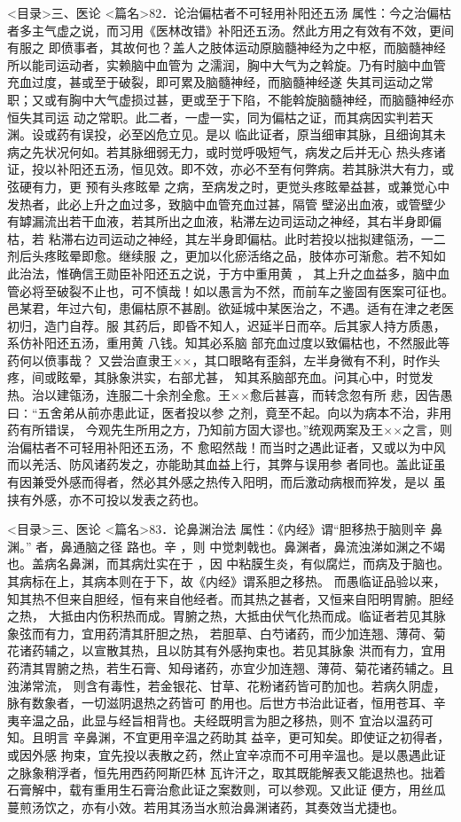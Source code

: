 \documentclass[a4paper,12pt,UTF8,twoside]{ctexbook}
\begin{document}
<目录>三、医论
<篇名>82．论治偏枯者不可轻用补阳还五汤
属性：今之治偏枯者多主气虚之说，而习用《医林改错》补阳还五汤。然此方用之有效有不效，更间有服之 
即偾事者，其故何也？盖人之肢体运动原脑髓神经为之中枢，而脑髓神经所以能司运动者，实赖脑中血管为 
之濡润，胸中大气为之斡旋。乃有时脑中血管充血过度，甚或至于破裂，即可累及脑髓神经，而脑髓神经遂 
失其司运动之常职；又或有胸中大气虚损过甚，更或至于下陷，不能斡旋脑髓神经，而脑髓神经亦恒失其司运 
动之常职。此二者，一虚一实，同为偏枯之证，而其病因实判若天渊。设或药有误投，必至凶危立见。是以 
临此证者，原当细审其脉，且细询其未病之先状况何如。若其脉细弱无力，或时觉呼吸短气，病发之后并无心 
热头疼诸证，投以补阳还五汤，恒见效。即不效，亦必不至有何弊病。若其脉洪大有力，或弦硬有力，更 
预有头疼眩晕 
之病，至病发之时，更觉头疼眩晕益甚，或兼觉心中发热者，此必上升之血过多，致脑中血管充血过甚，隔管 
壁泌出血液，或管壁少有罅漏流出若干血液，若其所出之血液，粘滞左边司运动之神经，其右半身即偏枯，若 
粘滞右边司运动之神经，其左半身即偏枯。此时若投以拙拟建瓴汤，一二剂后头疼眩晕即愈。继续服 
之，更加以化瘀活络之品，肢体亦可渐愈。若不知如此治法，惟确信王勋臣补阳还五之说，于方中重用黄 ， 
其上升之血益多，脑中血管必将至破裂不止也，可不慎哉！如以愚言为不然，而前车之鉴固有医案可征也。 
邑某君，年过六旬，患偏枯原不甚剧。欲延城中某医治之，不遇。适有在津之老医初归，造门自荐。服 
其药后，即昏不知人，迟延半日而卒。后其家人持方质愚，系仿补阳还五汤，重用黄 八钱。知其必系脑 
部充血过度以致偏枯也，不然服此等药何以偾事哉？ 
又尝治直隶王××，其口眼略有歪斜，左半身微有不利，时作头疼，间或眩晕，其脉象洪实，右部尤甚， 
知其系脑部充血。问其心中，时觉发热。治以建瓴汤，连服二十余剂全愈。王××愈后甚喜，而转念忽有所 
悲，因告愚曰∶“五舍弟从前亦患此证，医者投以参 之剂，竟至不起。向以为病本不治，非用药有所错误， 
今观先生所用之方，乃知前方固大谬也。”统观两案及王××之言，则治偏枯者不可轻用补阳还五汤，不 
愈昭然哉！而当时之遇此证者，又或以为中风而以羌活、防风诸药发之，亦能助其血益上行，其弊与误用参 
者同也。盖此证虽有因兼受外感而得者，然必其外感之热传入阳明，而后激动病根而猝发，是以 
虽挟有外感，亦不可投以发表之药也。 

<目录>三、医论
<篇名>83．论鼻渊治法
属性：《内经》谓“胆移热于脑则辛 鼻渊。” 者，鼻通脑之径 
路也。辛 ，则 中觉刺戟也。鼻渊者，鼻流浊涕如渊之不竭也。盖病名鼻渊，而其病灶实在于 ，因 
中粘膜生炎，有似腐烂，而病及于脑也。其病标在上，其病本则在于下，故《内经》谓系胆之移热。 
而愚临证品验以来，知其热不但来自胆经，恒有来自他经者。而其热之甚者，又恒来自阳明胃腑。胆经之热， 
大抵由内伤积热而成。胃腑之热，大抵由伏气化热而成。临证者若见其脉象弦而有力，宜用药清其肝胆之热， 
若胆草、白芍诸药，而少加连翘、薄荷、菊花诸药辅之，以宣散其热，且以防其有外感拘束也。若见其脉象 
洪而有力，宜用药清其胃腑之热，若生石膏、知母诸药，亦宜少加连翘、薄荷、菊花诸药辅之。且浊涕常流， 
则含有毒性，若金银花、甘草、花粉诸药皆可酌加也。若病久阴虚，脉有数象者，一切滋阴退热之药皆可 
酌用也。后世方书治此证者，恒用苍耳、辛夷辛温之品，此显与经旨相背也。夫经既明言为胆之移热，则不 
宜治以温药可知。且明言 辛鼻渊，不宜更用辛温之药助其 益辛，更可知矣。即使证之初得者，或因外感 
拘束，宜先投以表散之药，然止宜辛凉而不可用辛温也。是以愚遇此证之脉象稍浮者，恒先用西药阿斯匹林 
瓦许汗之，取其既能解表又能退热也。拙着石膏解中，载有重用生石膏治愈此证之案数则，可以参观。又此证 
便方，用丝瓜蔓煎汤饮之，亦有小效。若用其汤当水煎治鼻渊诸药，其奏效当尤捷也。 
\end{document}

